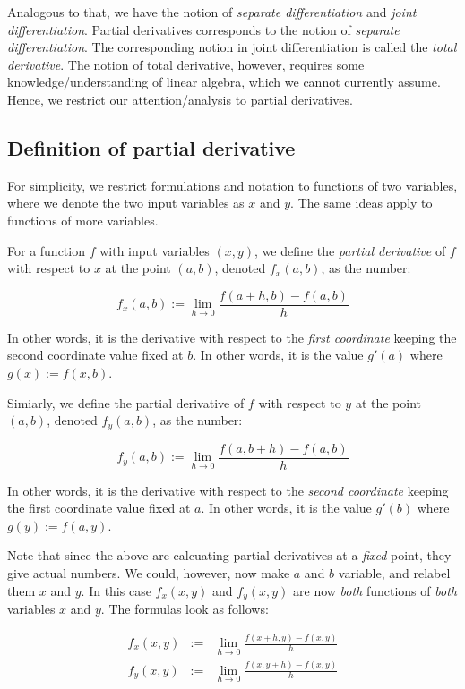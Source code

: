 \documentclass[10pt]{amsart}
\begin{document}
Analogous to that, we have the notion of {\em separate
differentiation} and {\em joint differentiation}. Partial derivatives
corresponds to the notion of {\em separate differentiation}. The
corresponding notion in joint differentiation is called the {\em total
derivative}. The notion of total derivative, however, requires some
knowledge/understanding of linear algebra, which we cannot currently
assume. Hence, we restrict our attention/analysis to partial
derivatives.

\subsection{Definition of partial derivative}

For simplicity, we restrict formulations and notation to functions of
two variables, where we denote the two input variables as $x$ and
$y$. The same ideas apply to functions of more variables.

For a function $f$ with input variables $(x,y)$, we define the {\em
partial derivative} of $f$ with respect to $x$ at the point $(a,b)$,
denoted $f_x(a,b)$, as the number:

$$f_x(a,b) := \lim_{h \to 0} \frac{f(a + h,b) - f(a,b)}{h}$$

In other words, it is the derivative with respect to the {\em first
coordinate} keeping the second coordinate value fixed at $b$. In other
words, it is the value $g'(a)$ where $g(x) := f(x,b)$.

Simiarly, we define the partial derivative of $f$ with respect to $y$
at the point $(a,b)$, denoted $f_y(a,b)$, as the number:

$$f_y(a,b) := \lim_{h \to 0} \frac{f(a,b + h) - f(a,b)}{h}$$

In other words, it is the derivative with respect to the {\em second
coordinate} keeping the first coordinate value fixed at $a$. In other
words, it is the value $g'(b)$ where $g(y) := f(a,y)$.

Note that since the above are calcuating partial derivatives at a {\em
fixed} point, they give actual numbers. We could, however, now make
$a$ and $b$ variable, and relabel them $x$ and $y$. In this case
$f_x(x,y)$ and $f_y(x,y)$ are now {\em both} functions of {\em both}
variables $x$ and $y$. The formulas look as follows:

\begin{eqnarray*}
  f_x(x,y) & := & \lim_{h \to 0} \frac{f(x + h,y) - f(x,y)}{h}\\
  f_y(x,y) & := & \lim_{h \to 0} \frac{f(x,y + h) - f(x,y)}{h}\\
\end{eqnarray*}
\end{document}

